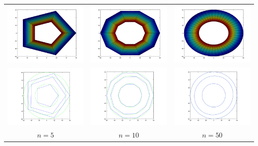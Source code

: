     {\centering \begin{tabular}{ccc}
      \includegraphics[width=4.5cm]{graficos/2/2a-5.png} &
      \includegraphics[width=4.5cm]{graficos/2/2a-10.png} &
      \includegraphics[width=4.5cm]{graficos/2/2a-50.png} \\
      \includegraphics[width=4.5cm]{graficos/2/2a-5-iso.png} &
      \includegraphics[width=4.5cm]{graficos/2/2a-10-iso.png} &
      \includegraphics[width=4.5cm]{graficos/2/2a-50-iso.png} \\
      {\small $n = 5$} &
      {\small $n = 10$} &
      {\small $n = 50$} \\
    \end{tabular}}


